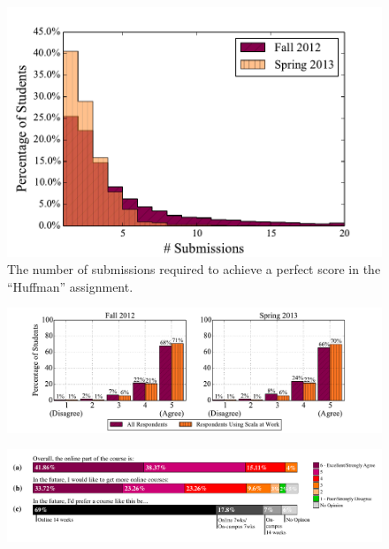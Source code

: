 \documentclass{sig-alternate}
\begin{document}
\begin{figure}[ht!]
  \centering
  \includegraphics[width=\columnwidth]{plots/top-scores-submissions-histogram.pdf}
  \caption{The number of submissions required to achieve a perfect score in the ``Huffman'' assignment.}
  \label{fig:top-scores-submissions}
\end{figure}

\begin{figure}[ht!]
  \centering
  \includegraphics[width=\textwidth]{plots/worth-it-apply-it.pdf}
  \caption{}
  \label{fig:worth-it-apply-it}
\end{figure}

\begin{figure}[ht!]
  \centering
  \includegraphics[width=\textwidth]{plots/epfl-course-eval.pdf}
  \caption{}
  \label{fig:epfl-course-eval}
\end{figure}
\end{document}

